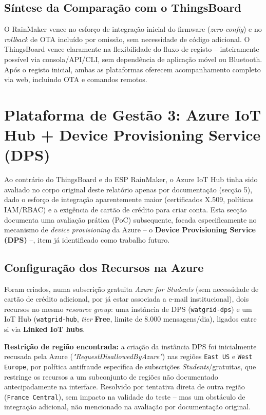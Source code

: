 \documentclass[a4paper,12pt]{article}
\begin{document}
\subsection{Síntese da Comparação com o ThingsBoard}
O RainMaker vence no esforço de integração inicial do firmware (\textit{zero-config}) e no \textit{rollback} de OTA incluído por omissão, sem necessidade de código adicional. O ThingsBoard vence claramente na flexibilidade do fluxo de registo -- inteiramente possível via consola/API/CLI, sem dependência de aplicação móvel ou Bluetooth. Após o registo inicial, ambas as plataformas oferecem acompanhamento completo via web, incluindo OTA e comandos remotos.

\section{Plataforma de Gestão 3: Azure IoT Hub + Device Provisioning Service (DPS)}
Ao contrário do ThingsBoard e do ESP RainMaker, o Azure IoT Hub tinha sido avaliado no corpo original deste relatório apenas por documentação (secção 5), dado o esforço de integração aparentemente maior (certificados X.509, políticas IAM/RBAC) e a exigência de cartão de crédito para criar conta. Esta secção documenta uma avaliação prática (PoC) subsequente, focada especificamente no mecanismo de \textit{device provisioning} da Azure -- o \textbf{Device Provisioning Service (DPS)} --, item já identificado como trabalho futuro.

\subsection{Configuração dos Recursos na Azure}
Foram criados, numa subscrição gratuita \textit{Azure for Students} (sem necessidade de cartão de crédito adicional, por já estar associada a e-mail institucional), dois recursos no mesmo \textit{resource group}: uma instância de DPS (\texttt{watgrid-dps}) e um IoT Hub (\texttt{watgrid-hub}, \textit{tier} \textbf{Free}, limite de 8.000 mensagens/dia), ligados entre si via \textbf{Linked IoT hubs}.

\textbf{Restrição de região encontrada:} a criação da instância DPS foi inicialmente recusada pela Azure (\textit{"RequestDisallowedByAzure"}) nas regiões \texttt{East US} e \texttt{West Europe}, por política antifraude específica de subscrições \textit{Students}/gratuitas, que restringe os recursos a um subconjunto de regiões não documentado antecipadamente na interface. Resolvido por tentativa direta de outra região (\texttt{France Central}), sem impacto na validade do teste -- mas um obstáculo de integração adicional, não mencionado na avaliação por documentação original.
\end{document}

